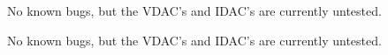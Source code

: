 
\begin{DoxyRefList}
\item[\label{bug__bug000001}%
\hypertarget{bug__bug000001}{}%
File \hyperlink{mem1_8c}{mem1.c} ]No known bugs, but the V\+D\+A\+C's and I\+D\+A\+C's are currently untested. 
\item[\label{bug__bug000002}%
\hypertarget{bug__bug000002}{}%
File \hyperlink{mem1_8h}{mem1.h} ]No known bugs, but the V\+D\+A\+C's and I\+D\+A\+C's are currently untested.
\end{DoxyRefList}